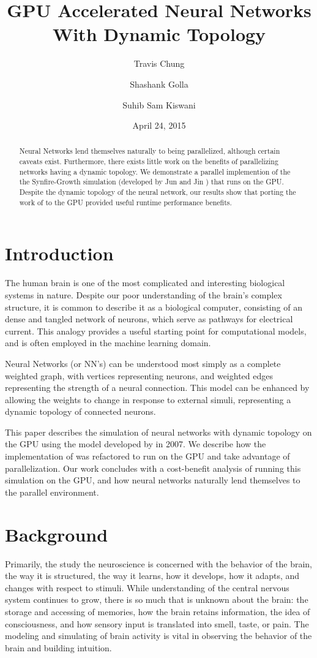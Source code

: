 \documentclass[a4paper]{article}
\title{GPU Accelerated Neural Networks With Dynamic Topology}
\author{Travis Chung
    \and Shashank Golla
    \and Suhib Sam Kiswani
}
\date{April 24, 2015}
\begin{document}
\maketitle

\begin{abstract}
Neural Networks lend themselves naturally to being parallelized, although certain caveats exist. Furthermore, there exists little work on the benefits of parallelizing networks having a dynamic topology. We demonstrate a parallel implemention of the the Synfire-Growth simulation (developed by Jun and Jin \cite{synfire}) that runs on the GPU. Despite the dynamic topology of the neural network, our results show that porting the work of \cite{synfire} to the GPU provided useful runtime performance benefits.
\end{abstract}


\section{Introduction}
The human brain is one of the most complicated and interesting biological systems in nature. Despite our poor understanding of the brain's complex structure, it is common to describe it as a biological computer, consisting of an dense and tangled network of neurons, which serve as pathways for electrical current. This analogy provides a useful starting point for computational models, and is often employed in the machine learning domain.

Neural Networks (or NN's) can be understood most simply as a complete weighted graph, with vertices representing neurons, and weighted edges representing the strength of a neural connection. This model can be enhanced by allowing the weights to change in response to external simuli, representing a dynamic topology of connected neurons.


This paper describes the simulation of neural networks with dynamic topology on the GPU using the model developed by \cite{synfire} in 2007. We describe how the implementation of \cite{synfire} was refactored to run on the GPU and take advantage of parallelization. Our work concludes with a cost-benefit analysis of running this simulation on the GPU, and how neural networks naturally lend themselves to the parallel environment.


\section{Background}
Primarily, the study the neuroscience is concerned with the behavior of the brain, the way it is structured, the way it learns, how it develops, how it adapts, and changes with respect to stimuli. While understanding of the central nervous system continues to grow, there is so much that is unknown about the brain: the storage and accessing of memories, how the brain retains information, the idea of consciousness, and how sensory input is translated into smell, taste, or pain. The modeling and simulating of brain activity is vital in observing the behavior of the brain and building intuition.
\end{document}
